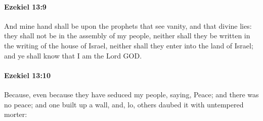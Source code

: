 		\paragraph{Ezekiel 13:9} %
			\label{EZEKIEL-13-9}

			And mine hand shall be upon the prophets that see vanity, and that divine lies: they shall not be in the assembly of my people, neither shall they be written in the writing of the house of Israel, neither shall they enter into the land of Israel; and ye shall know that I am the Lord GOD.


		\paragraph{Ezekiel 13:10} %
			\label{EZEKIEL-13-10}

			Because, even because they have seduced my people, saying, Peace; and there was no peace; and one built up a wall, and, lo, others daubed it with untempered morter:

